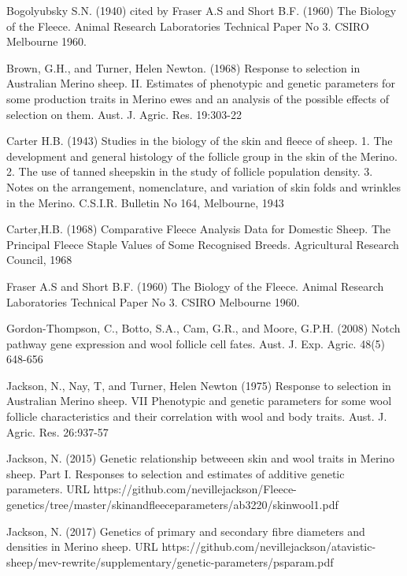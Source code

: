 \documentclass[titlepage]{article}  %
\begin{document}
\clearpage
\begin{thebibliography}{99}

 Bogolyubsky S.N. (1940) cited by Fraser A.S and Short B.F. (1960) The Biology of the Fleece. Animal Research Laboratories Technical Paper No 3. CSIRO Melbourne 1960.

Brown, G.H., and Turner, Helen Newton. (1968) Response to selection in Australian Merino sheep. II. Estimates of phenotypic and genetic parameters for some production traits in Merino ewes and an analysis of the possible effects of selection on them. Aust. J. Agric. Res. 19:303-22

Carter H.B. (1943) Studies in the biology of the skin and fleece of sheep. 1. The development and general histology of the follicle group in the skin of the Merino. 2. The use of tanned sheepskin in the study of follicle population density. 3. Notes on the arrangement, nomenclature, and variation of skin folds and wrinkles in the Merino. C.S.I.R. Bulletin No 164, Melbourne, 1943

Carter,H.B. (1968) Comparative Fleece Analysis Data for Domestic Sheep. The Principal Fleece Staple Values of Some Recognised Breeds. Agricultural Research Council, 1968

Fraser A.S and Short B.F. (1960) The Biology of the Fleece. Animal Research Laboratories Technical Paper No 3. CSIRO Melbourne 1960.

Gordon-Thompson, C., Botto, S.A., Cam, G.R., and Moore, G.P.H. (2008) Notch pathway gene expression and wool follicle cell fates. Aust. J. Exp. Agric. 48(5) 648-656

Jackson, N., Nay, T, and Turner, Helen Newton (1975) Response to selection in Australian Merino sheep. VII Phenotypic and genetic parameters for some wool follicle characteristics and their correlation with wool and body traits. Aust. J. Agric. Res. 26:937-57

Jackson, N. (2015) Genetic relationship betweeen skin and wool traits in Merino sheep. Part I. Responses to selection and estimates of additive genetic parameters. URL https://github.com/nevillejackson/Fleece-genetics/tree/master/skinandfleeceparameters/ab3220/skinwool1.pdf

Jackson, N. (2017) Genetics of primary and secondary fibre diameters and densities in Merino sheep. URL https://github.com/nevillejackson/atavistic-sheep/mev-rewrite/supplementary/genetic-parameters/psparam.pdf


\end{thebibliography}
\end{document}

